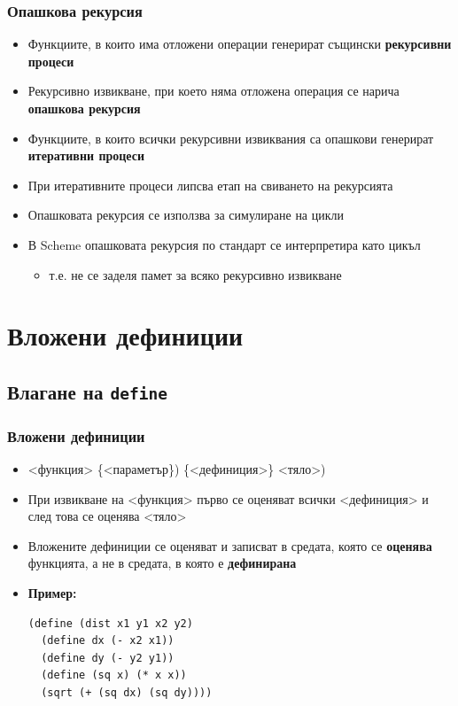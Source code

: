 \documentclass[alsotrans]{beamerswitch}
\begin{document}
\begin{frame}
  \frametitle{Опашкова рекурсия}

  \begin{itemize}[<+->]
  \item Функциите, в които има отложени операции генерират същински \textbf{рекурсивни процеси}
  \item Рекурсивно извикване, при което няма отложена операция се нарича \textbf{опашкова рекурсия}
  \item Функциите, в които всички рекурсивни извиквания са опашкови генерират \textbf{итеративни процеси}
  \item При итеративните процеси липсва етап на свиването на рекурсията
  \item Опашковата рекурсия се използва за симулиране на цикли
  \item В Scheme опашковата рекурсия \alert{по стандарт} се интерпретира като цикъл
    \begin{itemize}
    \item т.е. не се заделя памет за всяко рекурсивно извикване
    \end{itemize}
  \end{itemize}
\end{frame}

\section{Вложени дефиниции}



\subsection{Влагане на \tt{define}}

\begin{frame}[fragile]
  \frametitle{Вложени дефиниции}

  \begin{itemize}[<+->]
  \item {}<функция> \{<параметър\}\tta) \{<дефиниция>\} <тяло>\tta)
  \item При извикване на <функция> първо се оценяват всички <дефиниция> и след това се оценява <тяло>
  \item Вложените дефиниции се оценяват и записват в средата, която се \textbf{оценява} функцията, а не в средата, в която е \textbf{дефинирана}
  \item \textbf{Пример:}\\
\begin{lstlisting}
(define (dist x1 y1 x2 y2)
  (define dx (- x2 x1))
  (define dy (- y2 y1))
  (define (sq x) (* x x))
  (sqrt (+ (sq dx) (sq dy))))
\end{lstlisting}
  \end{itemize}
\end{frame}
\end{document}
